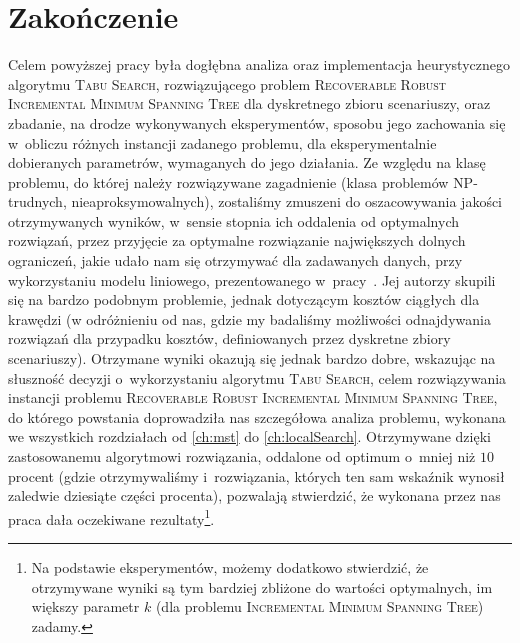 \chapter{Zakończenie}
\thispagestyle{chapterBeginStyle}





Celem powyższej pracy była dogłębna analiza oraz implementacja heurystycznego algorytmu \textsc{Tabu Search}, rozwiązującego problem \textsc{Recoverable Robust Incremental Minimum Spanning Tree} dla dyskretnego zbioru scenariuszy, oraz zbadanie, na drodze wykonywanych eksperymentów, sposobu jego zachowania się w~obliczu różnych instancji zadanego problemu, dla eksperymentalnie dobieranych parametrów, wymaganych do jego działania.
Ze względu na klasę problemu, do której należy rozwiązywane zagadnienie (klasa problemów \textsc{NP}-trudnych, nieaproksymowalnych), zostaliśmy zmuszeni do oszacowywania jakości otrzymywanych wyników, w~sensie stopnia ich oddalenia od optymalnych rozwiązań, przez przyjęcie za optymalne rozwiązanie największych dolnych ograniczeń, jakie udało nam się otrzymywać dla zadawanych danych, przy wykorzystaniu modelu liniowego, prezentowanego w~pracy~\cite{DBLP:journals/corr/HradovichKZ16}.
Jej autorzy skupili się na bardzo podobnym problemie, jednak dotyczącym kosztów ciągłych dla krawędzi (w odróżnieniu od nas, gdzie my badaliśmy możliwości odnajdywania rozwiązań dla przypadku kosztów, definiowanych przez dyskretne zbiory scenariuszy).
Otrzymane wyniki okazują się jednak bardzo dobre, wskazując na słuszność decyzji o~wykorzystaniu algorytmu \textsc{Tabu Search}, celem rozwiązywania instancji problemu \textsc{Recoverable Robust Incremental Minimum Spanning Tree}, do którego powstania doprowadziła nas szczegółowa analiza problemu, wykonana we wszystkich rozdziałach od \ref{ch:mst} do \ref{ch:localSearch}.
Otrzymywane dzięki zastosowanemu algorytmowi rozwiązania, oddalone od optimum o~mniej niż $10$ procent (gdzie otrzymywaliśmy i~rozwiązania, których ten sam wskaźnik wynosił zaledwie dziesiąte części procenta), pozwalają stwierdzić, że wykonana przez nas praca dała oczekiwane rezultaty\footnote{
	Na podstawie eksperymentów, możemy dodatkowo stwierdzić, że otrzymywane wyniki są tym bardziej zbliżone do wartości optymalnych, im większy parametr $k$ (dla problemu \textsc{Incremental Minimum Spanning Tree}) zadamy.
}.